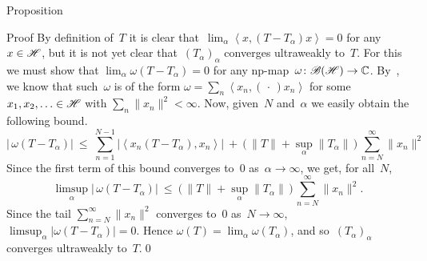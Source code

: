 \documentclass[a]{subfiles}
\begin{document}
\begin{parsec}
\begin{point}{Proposition}
\begin{point}{Proof}
By definition of~$T$ it is clear 
that~$\lim_\alpha \left<x,(T-T_\alpha)x\right>=0$
for any~$x\in\mathscr{H}$,
but it is not yet clear that~$(T_\alpha)_\alpha$ converges ultraweakly to~$T$.
For this we must show that $\lim_\alpha \omega(T-T_\alpha)=0$
for any np-map~$\omega\colon \mathscr{B}(\mathscr{H})\to \mathbb{C}$.
By~,
we know that such~$\omega$ is of the form
$\omega=\sum_n \left<x_n,(\,\cdot\,)x_n\right>$
for some $x_1,x_2,\dotsc\in\mathscr{H}$ with $\sum_n\|x_n\|^2<\infty$.
Now, given~$N$ and~$\alpha$ we easily obtain the 
following bound.
\begin{equation*}
	|\,\omega(T-T_\alpha)| \ \leq\  
	\sum_{n=1}^{N-1} \left|\left<x_n(T-T_\alpha),x_n\right>\right|
\ +\ \bigl(\,\|T\|+\sup_\alpha\|T_\alpha\|\,\bigr)\,\sum_{n=N}^\infty \|x_n\|^2 
\end{equation*}
Since the first term of this bound converges to~$0$ as~$\alpha\to\infty$,
we get, for all~$N$,
\begin{equation*}
	\limsup_\alpha |\,\omega(T-T_\alpha)| \ \leq\ 
	\bigl(\,\|T\|+\sup_\alpha\|T_\alpha\|\,\bigr)\,\sum_{n=N}^\infty \|x_n\|^2.
\end{equation*}
Since the tail $\sum_{n=N}^\infty\|x_n\|^2$
converges to~$0$ as~$N\to \infty$,
$\limsup_\alpha \left|\omega(T-T_\alpha)\right|=0$.
Hence $\omega(T)=\lim_\alpha \omega(T_\alpha)$,
and so~$(T_\alpha)_\alpha$ converges ultraweakly to~$T$.\qed
\end{point}
\end{point}
\end{parsec}
\end{document}
